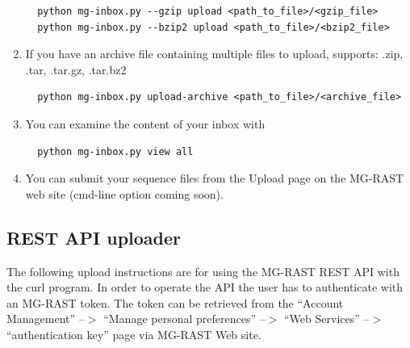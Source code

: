 \documentclass[12pt,fullpage]{report}
\begin{document}
\begin{enumerate}
\begin{small}
\begin{lstlisting}
  python mg-inbox.py --gzip upload <path_to_file>/<gzip_file>
  python mg-inbox.py --bzip2 upload <path_to_file>/<bzip2_file>
\end{lstlisting}
\end{small}
\item If you have an archive file containing multiple files to upload, supports: .zip, .tar, .tar.gz, .tar.bz2
\begin{small}
\begin{lstlisting}
  python mg-inbox.py upload-archive <path_to_file>/<archive_file>
\end{lstlisting}
\end{small}
\item You can examine the content of your inbox with
\begin{small}
\begin{lstlisting}
  python mg-inbox.py view all
\end{lstlisting}
\end{small}

\item You can submit your sequence files from the Upload page on the MG-RAST web site (cmd-line option coming soon).
\end{enumerate}

\subsection{REST API uploader}

The following upload instructions are for using the MG-RAST REST API with the curl program. In order to operate the API the user has to authenticate with an MG-RAST token. The token can be retrieved from the “Account Management” --$>$ “Manage personal preferences” --$>$ “Web Services” --$>$ “authentication key” page via MG-RAST Web site.
\end{document}
